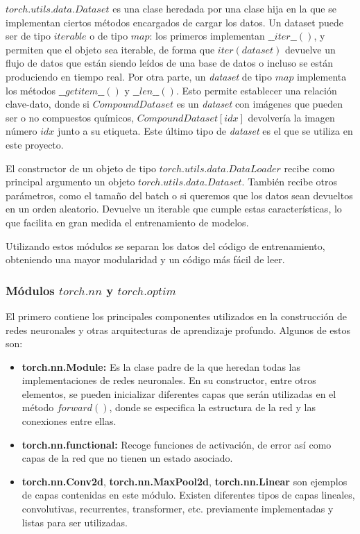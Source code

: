 $torch.utils.data.Dataset$ es una clase heredada por una clase hija en la que se implementan ciertos métodos encargados de cargar los datos. Un dataset puede ser de tipo $iterable$ o de tipo $map$: los primeros implementan $\_\_iter\_\_()$, y permiten que el objeto sea iterable, de forma que $iter(dataset)$ devuelve un flujo de datos que están siendo leídos de una base de datos o incluso se están produciendo en tiempo real. Por otra parte, un \textit{dataset} de tipo $map$ implementa los métodos $\_\_getitem\_\_()$ y $\_\_len\_\_()$. Esto permite establecer una relación clave-dato, donde si $CompoundDataset$ es un \textit{dataset} con imágenes que pueden ser o no compuestos químicos, $CompoundDataset[idx]$ devolvería la imagen número $idx$ junto a su etiqueta. Este último tipo de \textit{dataset} es el que se utiliza en este proyecto.

El constructor de un objeto de tipo $torch.utils.data.DataLoader$ recibe como principal argumento un objeto $torch.utils.data.Dataset$. También recibe otros parámetros, como el tamaño del batch o si queremos que los datos sean devueltos en un orden aleatorio. Devuelve un iterable que cumple estas características, lo que facilita en gran medida el entrenamiento de modelos. 

Utilizando estos módulos se separan los datos del código de entrenamiento, obteniendo una mayor modularidad y un código más fácil de leer. \cite{pytorch-doc}

\subsubsection{Módulos $torch.nn$ y $torch.optim$}
El primero contiene los principales componentes utilizados en la construcción de redes neuronales y otras arquitecturas de aprendizaje profundo. Algunos de estos son:

\begin{itemize}
    \item \textbf{torch.nn.Module:} Es la clase padre de la que heredan todas las implementaciones de redes neuronales. En su constructor, entre otros elementos, se pueden inicializar diferentes capas que serán utilizadas en el método $forward()$, donde se especifica la estructura de la red y las conexiones entre ellas.
    \item \textbf{torch.nn.functional:} Recoge funciones de activación, de error así como capas de la red que no tienen un estado asociado.
    \item \textbf{torch.nn.Conv2d}, \textbf{torch.nn.MaxPool2d}, \textbf{torch.nn.Linear} son ejemplos de capas contenidas en este módulo. Existen diferentes tipos de capas lineales, convolutivas, recurrentes, transformer, etc. previamente implementadas y listas para ser utilizadas.
\end{itemize}

